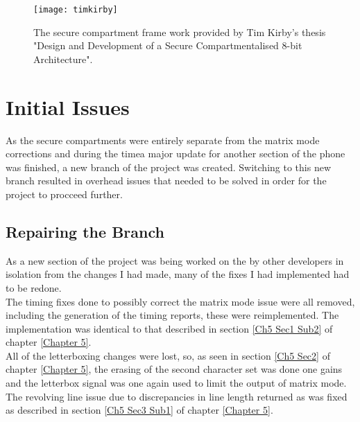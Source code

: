 \begin{figure}
  \centering
  \texttt{[image: timkirby]}
  \caption{The secure compartment frame work provided by Tim Kirby's thesis "Design and Development of a Secure Compartmentalised 8-bit Architecture".}
  \label{fig:timkirby}
\end{figure}


\section{Initial Issues}

\label{Ch6 Sec2}

As the secure compartments were entirely separate from the matrix mode corrections and during the timea major update for another section of the phone was finished, a new branch of the project was created. Switching to this new branch resulted in overhead issues that needed to be solved in order for the project to procceed further.

\subsection{Repairing the Branch}

\label{Ch6 Sec2 Sub1}

As a new section of the project was being worked on the by other developers in isolation from the changes I had made, many of the fixes I had implemented had to be redone.\\
The timing fixes done to possibly correct the matrix mode issue were all removed, including the generation of the timing reports, these were reimplemented. The implementation was identical to that described in section \ref{Ch5 Sec1 Sub2} of chapter \ref{Chapter 5}.\\
All of the letterboxing changes were lost, so, as seen in section \ref{Ch5 Sec2} of chapter \ref{Chapter 5}, the erasing of the second character set was done one gains and the letterbox signal was one again used to limit the output of matrix mode.\\
The revolving line issue due to discrepancies in line length returned as was fixed as described in section \ref{Ch5 Sec3 Sub1} of chapter \ref{Chapter 5}.\\

